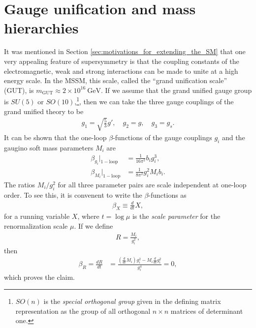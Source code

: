 \documentclass[twoside,english]{uiofysmaster}
\begin{document}
 \section{Gauge unification and mass hierarchies}
 It was mentioned in Section \ref{sec:motivations_for_extending_the_SM} that one very appealing feature of supersymmetry is that the coupling constants of the electromagnetic, weak and strong interactions can be made to unite at a high energy scale. In the MSSM, this scale, called the ``grand unification scale'' (GUT), is $m_\mathrm{GUT} \approx 2\times 10^{16} ~\mathrm{GeV}$. If we assume that the grand unified gauge group is $SU(5)$ or $SO(10)$,\footnote{$SO(n)$ is the {\it special orthogonal group} given in the defining matrix representation as the group of all orthogonal $n\times n$ matrices of determinant one.}, then we can take the three gauge couplings of the grand unified theory to be \cite{Batzing:2013}
 \begin{align}
 	g_1 = \sqrt{\frac{5}{3}}g', \quad g_2 = g, \quad g_3 = g_s.
 \end{align}
 It can be shown that the one-loop $\beta$-functions of the gauge couplings $g_i$ and the gaugino soft mass parameters $M_i$ are
 \begin{align}
 	\beta_{g_i}|_\mathrm{1-loop} &= \frac{1}{16\pi^2} b_i g_i^3,\\
 	\beta_{M_i} |_\mathrm{1-loop} &= \frac{1}{8\pi^2}g_i^2 M_i b_i.
 \end{align}
The ratios $M_i/g_i^2$ for all three parameter pairs are scale independent at one-loop order. To see this, it is convenent to write the $\beta$-functions as 
 \begin{align}
 	\beta_X \equiv \frac{d}{dt}X,
 \end{align}
 for a running variable $X$, where $t = \log \mu$ is the {\it scale parameter} for the renormalization scale $\mu$. If we define
 \begin{align}
 	R = \frac{M_i}{g_i^2},
 \end{align}
 then
 \begin{align}
 	\beta_R = \frac{dR}{dt} &= \frac{(\frac{d}{dt}M_i)g_i^2 - M_i\frac{d}{dt}g_i^2}{g_i^4} = 0, \nonumber
 \end{align}
 which proves the claim. 
\end{document}
